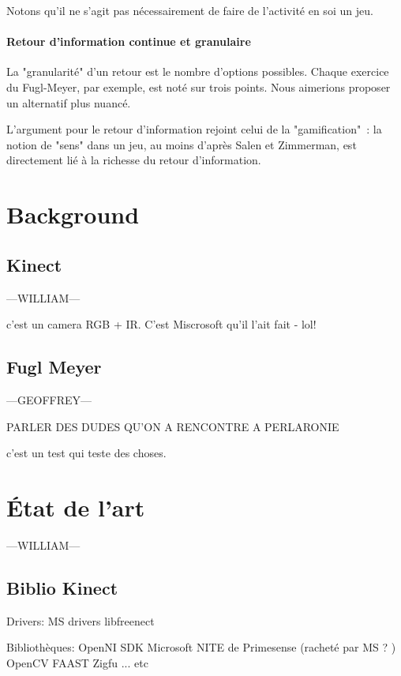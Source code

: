\documentclass{report}
\begin{document}
		Notons qu'il ne s'agit pas nécessairement de faire de l'activité en soi un 
		jeu.
		
		
    \subsubsection{Retour d'information continue et granulaire}
    La "granularité" d'un retour est le nombre d'options possibles. 
    Chaque exercice du Fugl-Meyer, par exemple, est noté sur trois points. Nous 
    aimerions proposer un alternatif plus nuancé.
    
    L'argument pour le retour d'information rejoint celui de la "gamification"~:
    la notion de "sens" dans un jeu, au moins d'après Salen et Zimmerman, est 
    directement lié à la richesse du retour d'information.
    

		
	\chapter{Background}
		\section{Kinect} 		---WILLIAM---
		
		c'est un camera RGB + IR. C'est Miscrosoft qu'il l'ait fait - lol!
		
		\section{Fugl Meyer} 		---GEOFFREY---
		
		PARLER DES DUDES QU'ON A RENCONTRE A PERLARONIE
		
		
		c'est un test qui teste des choses.
		
	\chapter{État de l'art} 		---WILLIAM---
	

	
		\section{Biblio Kinect}
		
		Drivers:
		MS drivers
		libfreenect
		
		Bibliothèques:
		OpenNI
		SDK Microsoft
		NITE de Primesense (racheté par MS ? )
		OpenCV
		FAAST
		Zigfu
		... etc
		
\end{document}
